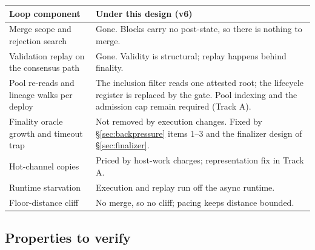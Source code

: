 \documentclass[11pt]{article}
\begin{document}
\begin{longtable}{@{}P{5.0cm}P{10.0cm}@{}}
\toprule
\textbf{Loop component} & \textbf{Under this design (v6)} \\
\midrule
\endhead
Merge scope and rejection search & Gone. Blocks carry no post-state, so there is nothing to merge. \\
Validation replay on the consensus path & Gone. Validity is structural; replay happens behind finality. \\
Pool re-reads and lineage walks per deploy & The inclusion filter reads one attested root; the lifecycle register is replaced by the gate. Pool indexing and the admission cap remain required (Track A). \\
Finality oracle growth and timeout trap & Not removed by execution changes. Fixed by \S\ref{sec:backpressure} items 1--3 and the finalizer design of \S\ref{sec:finalizer}. \\
Hot-channel copies & Priced by host-work charges; representation fix in Track A. \\
Runtime starvation & Execution and replay run off the async runtime. \\
Floor-distance cliff & No merge, so no cliff; pacing keeps distance bounded. \\
\bottomrule
\end{longtable}

\subsection{Properties to verify}
\end{document}

